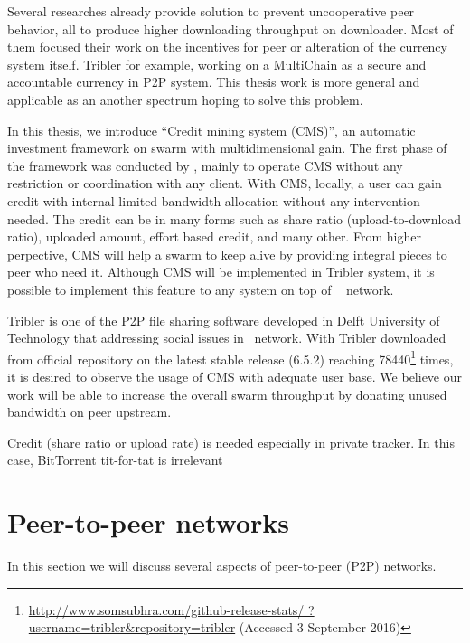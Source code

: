 Several researches already provide solution to prevent uncooperative peer behavior, all to produce higher downloading throughput on downloader. Most of them focused their work on the incentives for peer or alteration of the currency system itself. Tribler for example, working on a MultiChain \cite{2015:multichain:norberhuis} as a secure and accountable currency in P2P system.  This thesis work is more general and applicable as an another spectrum hoping to solve this problem. 

In this thesis, we introduce ``Credit mining system (CMS)'', an automatic investment framework on swarm with multidimensional gain. The first phase of the framework was conducted by \citeauthor{2015:creditmining:capota}, mainly to operate CMS without any restriction or coordination with any client. With CMS, locally, a user can gain credit with internal limited bandwidth allocation without any intervention needed. The credit can be in many forms such as share ratio (upload-to-download ratio), uploaded amount, effort based credit, and many other. From higher perpective, CMS will help a swarm to keep alive by providing integral pieces to peer who need it. Although CMS will be implemented in Tribler system, it is possible to implement this feature to any system on top of \bt~ network.

Tribler is one of the P2P file sharing software developed in Delft University of Technology that addressing social issues in \bt~network\cite{2008:tribler:pouwelse}. With Tribler downloaded from official repository on the latest stable release (6.5.2) reaching  78440\footnote{\url{http://www.somsubhra.com/github-release-stats/ ?username=tribler&repository=tribler} (Accessed 3 September 2016)} times, it is desired to observe the usage of CMS with adequate user base. We believe our work will be able to increase the overall swarm throughput by donating unused bandwidth on peer upstream.


%
Credit (share ratio or upload rate) is needed especially in private tracker. In this case, BitTorrent tit-for-tat is irrelevant \cite{2010:pubpriv:meulpolder}




\section{Peer-to-peer networks}
In this section we will discuss several aspects of peer-to-peer (P2P) networks. 



